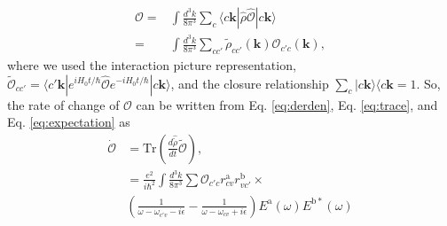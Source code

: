 \documentclass[prb,11pt,tightenlines,twocolumn,aps]{revtex4-1}
\begin{document}
\begin{align}
\mathcal{O} 
=&
\int \frac{d^{3}k}{8\pi^{3}}\sum_{c} \langle c \mathbf{k} 
| \hat{\rho} \hat{\mathcal{O}} |
c\mathbf{k} \rangle \nonumber \\
=& 
\int \frac{d^{3}k}{8\pi^{3}} \sum_{cc'} \tilde{\rho}_{cc'}(\mathbf{k}) 
\mathcal{O}_{c'c}(\mathbf{k}),
\label{eq:expectation}
\end{align}
where we used the interaction picture representation,
$\tilde{\mathcal{O}}_{cc'} = \langle c'\mathbf{k} | e^{iH_{0}t/\hbar}
\hat{\mathcal{O}} e^{-iH_{0}t/\hbar} | c\mathbf{k} \rangle$, and the closure
relationship $\sum_{c}|c\mathbf{k}\rangle \langle c\mathbf{k} = 1$. So, the
rate of change of $\mathcal{O}$ can be written from Eq. \eqref{eq:derden}, Eq.
\eqref{eq:trace}, and Eq. \eqref{eq:expectation} as
\begin{align}
\dot{\mathcal{O}} 
&=
\mathrm{Tr} \left( \frac{d \hat{\tilde{\rho}}}{dt} 
\tilde{\mathcal{O}} \right), 
\nonumber \\
&=\frac{e^{2}}{i\hbar^{2}} \int \frac{d^{3}k}{8\pi^{3}} 
\sum \mathcal{O}_{c'c} r^{\mathrm{a}}_{cv} r^{\mathrm{b}}_{vc'} \times
\nonumber \\
& \left( \frac{1}{\omega - \omega_{c'v} - i\epsilon} - 
\frac{1}{\omega - \omega_{cv} + i\epsilon} \right)
E^{\mathrm{a}}(\omega) E^{\mathrm{b*}}(\omega)
\label{eq:dotO}
\end{align}
\end{document}

